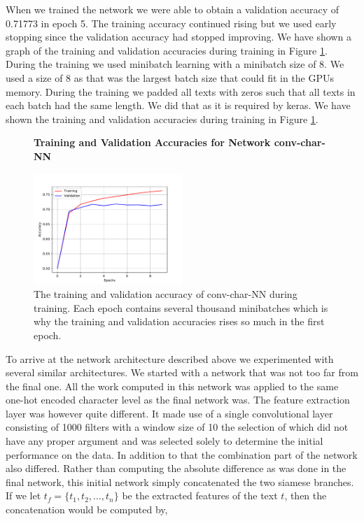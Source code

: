 When we trained the network we were able to obtain a validation accuracy of
0.71773 in epoch 5. The training accuracy continued rising but we used early
stopping since the validation accuracy had stopped improving. We have shown
a graph of the training and validation accuracies during training in Figure
\ref{fig:conv-char-NN-accuracies}. During the training we used minibatch
learning with a minibatch size of 8. We used a size of 8 as that was the largest
batch size that could fit in the GPUs memory. During the training we padded
all texts with zeros such that all texts in each batch had the same length. We
did that as it is required by keras. We have shown the training and validation
accuracies during training in Figure \ref{fig:conv-char-NN-accuracies}.

\begin{figure}
    \centering
    \textbf{Training and Validation Accuracies for Network \gls{conv-char-NN}}\par\medskip
    \includegraphics[width=0.5\textwidth]{./pictures/experiments/conv_char_nn/training_accuracy}
    \caption{The training and validation accuracy of \gls{conv-char-NN} during
        training. Each epoch contains several thousand minibatches which is why
        the training and validation accuracies rises so much in the first
        epoch.}
    \label{fig:conv-char-NN-accuracies}
\end{figure}

To arrive at the network architecture described above we experimented with
several similar architectures. We started with a network that was not too
far from the final one. All the work computed in this network was applied
to the same one-hot encoded character level as the final network was. The
feature extraction layer was however quite different. It made use of a single
convolutional layer consisting of 1000 filters with a window size of 10 the
selection of which did not have any proper argument and was selected solely
to determine the initial performance on the data. In addition to that the
combination part of the network also differed. Rather than computing the
absolute difference as was done in the final network, this initial network
simply concatenated the two siamese branches. If we let $t_f = \{t_1, t_2,
\dots, t_n\}$ be the extracted features of the text $t$, then the concatenation
would be computed by,

